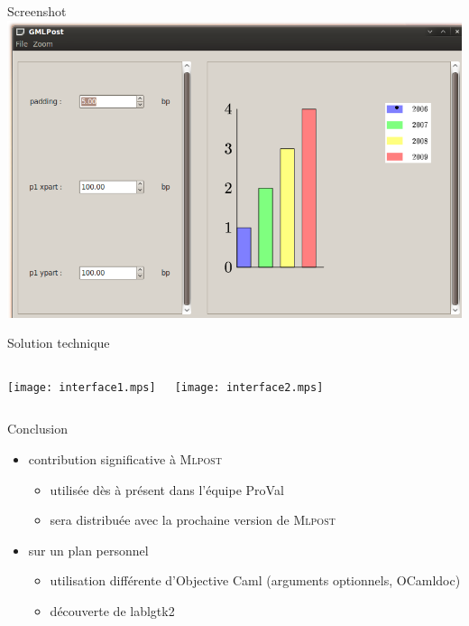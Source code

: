 \documentclass{beamer}
\newcommand{\mlpost}{\textsc{Mlpost}}
\begin{document}
\begin{frame}{Screenshot}
\includegraphics[scale=0.4]{screen2.png}
\end{frame}


\begin{frame}{Solution technique}
  \begin{columns}
    \begin{center}
      \texttt{[image: interface1.mps]}
    \end{center}
    \begin{center}
      \texttt{[image: interface2.mps]}
    \end{center}
  \end{columns}
\end{frame}

\begin{frame}{Conclusion}
  \begin{itemize}
  \item contribution significative à \mlpost
    \begin{itemize}
    \item<1-> utilisée dès à présent dans l'équipe ProVal
    \item<2-> sera distribuée avec la prochaine version de \mlpost
    \end{itemize}
    
    \bigskip
  \item<3-> sur un plan personnel
    \begin{itemize}
    \item<3-> utilisation différente d'Objective Caml (arguments optionnels, OCamldoc)
    \item<4-> découverte de lablgtk2
    \end{itemize}
  \end{itemize}
\end{frame}
\end{document}
